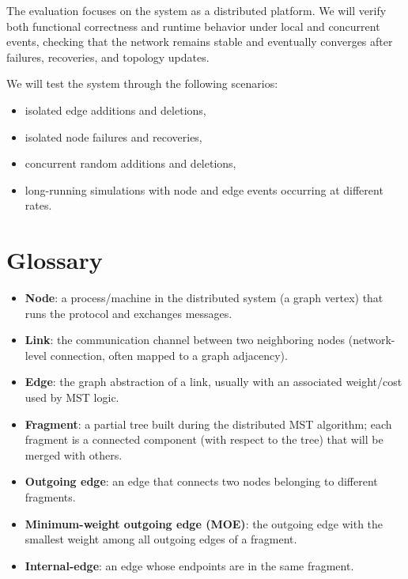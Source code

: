 The evaluation focuses on the system as a distributed platform. We will verify both functional correctness and runtime behavior under local and concurrent events, checking that the network remains stable and eventually converges after failures, recoveries, and topology updates.

We will test the system through the following scenarios:
\begin{itemize}
\item isolated edge additions and deletions,
\item isolated node failures and recoveries,
\item concurrent random additions and deletions,
\item long-running simulations with node and edge events occurring at different rates.
\end{itemize}


\section{Glossary}

\begin{itemize}
\item \textbf{Node}: a process/machine in the distributed system (a graph vertex) that runs the protocol and exchanges messages.
\item \textbf{Link}: the communication channel between two neighboring nodes (network-level connection, often mapped to a graph adjacency).
\item \textbf{Edge}: the graph abstraction of a link, usually with an associated weight/cost used by MST logic.
\item \textbf{Fragment}: a partial tree built during the distributed MST algorithm; each fragment is a connected component (with respect to the tree) that will be merged with others.
\item \textbf{Outgoing edge}: an edge that connects two nodes belonging to different fragments.
\item \textbf{Minimum-weight outgoing edge (MOE)}: the outgoing edge with the smallest weight among all outgoing edges of a fragment.
\item \textbf{Internal-edge}: an edge whose endpoints are in the same fragment.
\end{itemize}